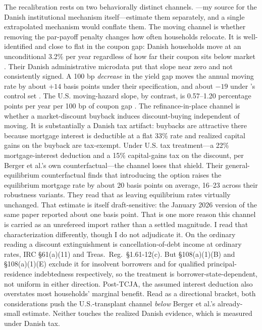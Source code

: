 \documentclass[12pt]{article}
\begin{document}
The recalibration rests on two behaviorally distinct channels. \citet{berger2026}---my source for the Danish institutional mechanism itself---estimate them separately, and a single extrapolated mechanism would conflate them. The moving channel is whether removing the par-payoff penalty changes how often households relocate. It is well-identified and close to flat in the coupon gap: Danish households move at an unconditional 3.2\% per year regardless of how far their coupon sits below market \citep[\S4.6, structural parameters in tab.~3]{berger2026}. Their Danish administrative microdata put that slope near zero and not consistently signed. A 100 bp \emph{decrease} in the yield gap moves the annual moving rate by about $+14$ basis points under their specification, and about $-19$ under \citeauthor{fonseca2024}'s control set \citep[\S3.3.2]{berger2026}. The U.S. moving-hazard slope, by contrast, is 0.57--1.20 percentage points per year per 100 bp of coupon gap \citep{fonseca2024}. The refinance-in-place channel is whether a market-discount buyback induces discount-buying independent of moving. It is substantially a Danish tax artifact: buybacks are attractive there because mortgage interest is deductible at a flat 33\% rate and realized capital gains on the buyback are tax-exempt. Under U.S. tax treatment---a 22\% mortgage-interest deduction and a 15\% capital-gains tax on the discount, per Berger et al.'s own counterfactual---the channel loses that shield. Their general-equilibrium counterfactual \citep[\S4.10.2]{berger2026} finds that introducing the option raises the equilibrium mortgage rate by about 20 basis points on average, 16--23 across their robustness variants. They read that as leaving equilibrium rates virtually unchanged. That estimate is itself draft-sensitive: the January 2026 version of the same paper reported about one basis point. That is one more reason this channel is carried as an unrefereed import rather than a settled magnitude. I read that characterization differently, though I do not adjudicate it. On the ordinary reading a discount extinguishment is cancellation-of-debt income at ordinary rates, IRC \S 61(a)(11) and Treas.\ Reg.\ \S 1.61-12(c). But \S 108(a)(1)(B) and \S 108(a)(1)(E) exclude it for insolvent borrowers and for qualified principal-residence indebtedness respectively, so the treatment is borrower-state-dependent, not uniform in either direction. Post-TCJA, the assumed interest deduction also overstates most households' marginal benefit. Read as a directional bracket, both considerations push the U.S.-transplant channel \emph{below} Berger et al.'s already-small estimate. Neither touches the realized Danish evidence, which is measured under Danish tax.
\end{document}
